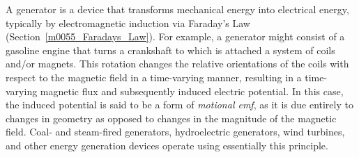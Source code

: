 

\label{m0030_Electric_Generator} %

A generator is a device that transforms mechanical energy into electrical energy, typically by electromagnetic induction via Faraday's Law (Section~\ref{m0055_Faradays_Law}).
For example, a generator might consist of a gasoline engine that turns a crankshaft to which is attached a system of coils and/or magnets.  This rotation changes the relative orientations of the coils with respect to the magnetic field in a time-varying manner, resulting in a time-varying magnetic flux and subsequently induced electric potential.
In this case, the induced potential is said to be a form of \emph{motional emf}, 
as it is due entirely to changes in geometry as opposed to changes in the magnitude of the magnetic field.
Coal- and steam-fired generators, hydroelectric generators, wind turbines, and other energy generation devices operate using essentially this principle.

